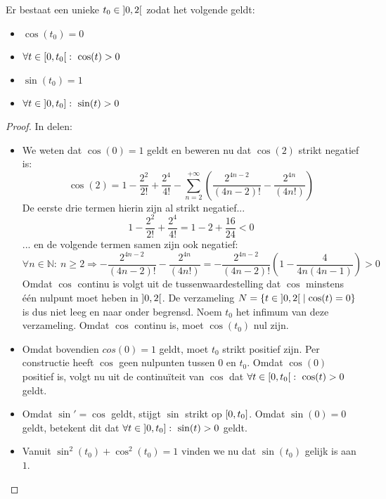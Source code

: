 \documentclass[main.tex]{subfiles}
\begin{document}
\begin{bpr}
  \label{pr:inleiding-pi}
  Er bestaat een unieke $t_{0} \in \interval[open]{0}{2}$ zodat het volgende geldt:
  \begin{itemize}
  \item $\cos(t_{0}) = 0$
  \item $\forall t\in \interval[open right]{0}{t_{0}}:\ \cos(t) > 0$
  \item $\sin(t_{0})=1$
  \item $\forall t\in \interval[open left]{0}{t_{0}}:\ \sin(t)> 0$ 
  \end{itemize}

  \begin{proof}
    In delen:
    \begin{itemize}
    \item 
    We weten dat $\cos(0) = 1$ geldt en beweren nu dat $\cos(2)$ strikt negatief is:
    \[ \cos(2) = 1 - \frac{2^{2}}{2!} + \frac{2^{4}}{4!} - \sum_{n=2}^{+\infty}\left( \frac{2^{4n-2}}{(4n-2)!} - \frac{2^{4n}}{(4n!)}\right) \]
    De eerste drie termen hierin zijn al strikt negatief...
    \[ 1 - \frac{2^{2}}{2!} + \frac{2^{4}}{4!} = 1-2+\frac{16}{24} < 0 \]
    ... en de volgende termen samen zijn ook negatief:
    \[
    \forall n\in \mathbb{N}:\ n \ge 2
    \Rightarrow -\frac{2^{4n-2}}{(4n-2)!} - \frac{2^{4n}}{(4n!)}
    = -\frac{2^{4n-2}}{(4n-2)!}\left( 1 - \frac{4}{4n(4n-1)} \right)
    > 0
    \]
    Omdat $\cos$ continu is volgt uit de tussenwaardestelling dat $\cos$ minstens \'e\'en nulpunt moet heben in $\interval[open]{0}{2}$.
    De verzameling $N = \{ t \in \interval[open]{0}{2} \mid \cos(t) = 0\}$ is dus niet leeg en naar onder begrensd.
    Noem $t_{0}$ het infimum van deze verzameling.
    Omdat $\cos$ continu is, moet $\cos(t_{0})$ nul zijn. \waarom
  \item 
    Omdat bovendien $cos(0) =1$ geldt, moet $t_{0}$ strikt positief zijn.
    Per constructie heeft $\cos$ geen nulpunten tussen $0$ en $t_{0}$.
    Omdat $\cos(0)$ positief is, volgt nu uit de continu\"iteit van $\cos$ dat $\forall t\in \interval[open right]{0}{t_{0}}:\ \cos(t)>0$ geldt.
  \item
    Omdat $\sin'=\cos$ geldt, stijgt $\sin$ strikt op $\interval{0}{t_{0}}$.
    Omdat $\sin(0) = 0$ geldt, betekent dit dat $\forall t\in \interval[open left]{0}{t_{0}}:\ \sin(t)>0$ geldt.
  \item Vanuit $\sin^{2}(t_{0}) + \cos^{2}(t_{0}) = 1$ vinden we nu dat $\sin(t_{0})$ gelijk is aan $1$.
    \end{itemize}
  \end{proof}
\end{bpr}
\end{document}
